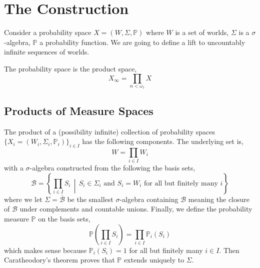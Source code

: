 \documentclass[12pt]{article}
\renewcommand{\P}{\mathbb{P}}
\newcommand{\B}{\mathcal{B}}
\begin{document}
\pagestyle{fancy}
\setlength{\headheight}{11pt}
\setlength{\headsep}{0.2in}

\section{The Construction}

Consider a probability space $X = (W, \Sigma, \P)$ where $W$ is a set of worlds, $\Sigma$ is a $\sigma$-algebra, $\P$ a probability function. We are going to define a lift to uncountably infinite sequences of worlds. 

\begin{defn}
The probability space is the product space,
\[ X_{\infty} = \prod_{\alpha < \omega_1} X \]
\end{defn}

\subsection{Products of Measure Spaces}

\begin{defn}
The product of a (possibility infinite) collection of probability spaces $\{ X_i = (W_i, \Sigma_i, \P_i) \}_{i \in I}$ has the following components. The underlying set is,
\[ W = \prod_{i \in I} W_i \]
with a $\sigma$-algebra constructed from the following the basis sets,
\[ \B = \left\{ \prod_{i \in I} S_i \, \middle| \, S_i \in \Sigma_i \text{ and } S_i = W_i \text{ for all but finitely many } i \right\} \]
where we let $\Sigma = \overline{\B}$ be the smallest $\sigma$-algebra containing $\B$ meaning the closure of $\B$ under complements and countable unions. Finally, we define the probability measure $\P$ on the basis sets,
\[ \P \left( \prod_{i \in I} S_i \right) = \prod_{i \in I} \P_i(S_i) \]
which makes sense because $\P_i(S_i) = 1$ for all but finitely many $i \in I$. Then Caratheodory's theorem proves that $\P$ extends uniquely to $\Sigma$.
\end{defn}
\end{document}
